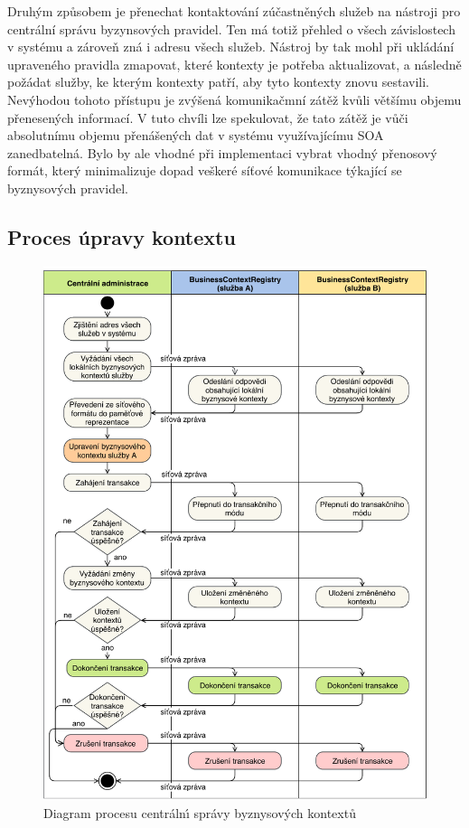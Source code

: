 Druhým způsobem je přenechat kontaktování zúčastněných služeb na nástroji pro centrální
správu byzynsových pravidel. Ten má totiž přehled o všech závislostech v systému a zároveň
zná i adresu všech služeb. Nástroj by tak mohl při ukládání upraveného pravidla zmapovat,
které kontexty je potřeba aktualizovat, a následně požádat služby, ke kterým kontexty patří,
aby tyto kontexty znovu sestavili. Nevýhodou tohoto přístupu je zvýšená komunikačmní zátěž kvůli většímu
objemu přenesených informací. V tuto chvíli lze spekulovat, že tato zátěž je vůči absolutnímu objemu
přenášených dat v systému využívajícímu \gls{SOA} zanedbatelná. Bylo by ale vhodné při implementaci
vybrat vhodný přenosový formát, který minimalizuje dopad veškeré síťové komunikace týkající se
byznysových pravidel.

\subsection{Proces úpravy kontextu}

\begin{figure}
    \centering
    \includegraphics[keepaspectratio=true, width=\linewidth]{figures/business-context-management.pdf}
    \caption{Diagram procesu centráln\'{\i} správy byznysov\'ych kontextů}
    \label{fig:business-context-management}
\end{figure}

